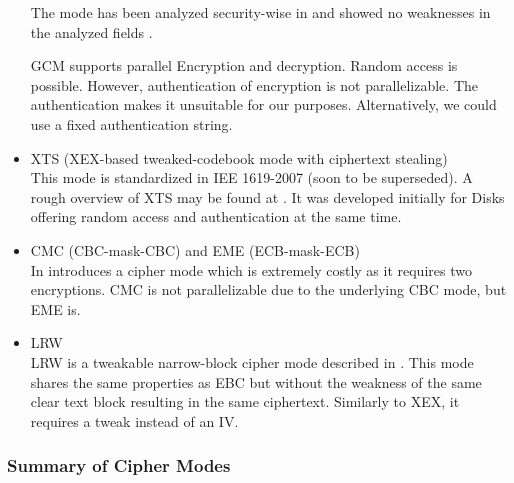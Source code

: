 \begin{itemize}
	The mode has been analyzed security-wise in \citeyear{mcgrew2004security} and showed no weaknesses in the analyzed fields \cite{mcgrew2004security}. 
	
	GCM supports parallel Encryption and decryption. Random access is possible. However, authentication of encryption is not parallelizable. The authentication makes it unsuitable for our purposes. Alternatively, we could use a fixed authentication string.
	\item XTS (XEX-based tweaked-codebook mode with ciphertext stealing)\\
	This mode is standardized in IEE 1619-2007 (soon to be superseded). A rough overview of XTS may be found at \cite{Martin2010}. It was developed initially for Disks offering random access and authentication at the same time. 
	\item CMC (CBC-mask-CBC) and EME (ECB-mask-ECB)\\ 
	In \cite{Halevi:2003} \citeauthor{Halevi:2003} introduces a cipher mode which is extremely costly as it requires two encryptions. CMC is not parallelizable due to the underlying CBC mode, but EME is. 
	\item LRW\\
	LRW is a tweakable narrow-block cipher mode described in \cite{tschorsch:translayeranon}. This mode shares the same properties as EBC but without the weakness of the same clear text block resulting in the same ciphertext. Similarly to XEX, it requires a tweak instead of an IV.
\end{itemize}

\subsubsection{Summary of Cipher Modes}

